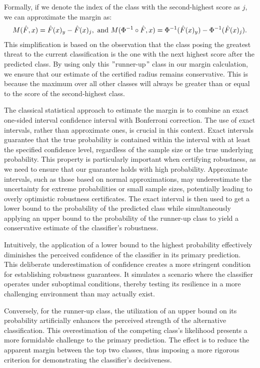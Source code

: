 Formally, if we denote the index of the class with the second-highest score as $j$, we can approximate the margin as:
\begin{align*}
    M(\Hat{F},x) =\Hat{F}(x)_{y} - \Hat{F}(x)_j, \text{ and }M(\Phi^{-1}\circ\Hat{F},x) =\Phi^{-1}(\Hat{F}(x)_{y}) - \Phi^{-1}(\Hat{F}(x)_j).
\end{align*}
This simplification is based on the observation that the class posing the greatest threat to the current classification is the one with the next highest score after the predicted class.
By using only this \("\)runner-up\("\) class in our margin calculation, we ensure that our estimate of the certified radius remains conservative.
This is because the maximum over all other classes will always be greater than or equal to the score of the second-highest class.

The classical statistical approach to estimate the margin is to combine an exact one-sided interval confidence interval with Bonferroni correction.
The use of exact intervals, rather than approximate ones, is crucial in this context.
Exact intervals guarantee that the true probability is contained within the interval with at least the specified confidence level, regardless of the sample size or the true underlying probability.
This property is particularly important when certifying robustness, as we need to ensure that our guarantee holds with high probability.
Approximate intervals, such as those based on normal approximations, may underestimate the uncertainty for extreme probabilities or small sample sizes, potentially leading to overly optimistic robustness certificates.
The exact interval is then used to get a lower bound to the probability of the predicted class while simultaneously applying an upper bound to the probability of the runner-up class to yield a conservative estimate of the classifier's robustness.

Intuitively, the application of a lower bound to the highest probability effectively diminishes the perceived confidence of the classifier in its primary prediction.
This deliberate underestimation of confidence creates a more stringent condition for establishing robustness guarantees.
It simulates a scenario where the classifier operates under suboptimal conditions, thereby testing its resilience in a more challenging environment than may actually exist.

Conversely, for the runner-up class, the utilization of an upper bound on its probability artificially enhances the perceived strength of the alternative classification.
This overestimation of the competing class's likelihood presents a more formidable challenge to the primary prediction.
The effect is to reduce the apparent margin between the top two classes, thus imposing a more rigorous criterion for demonstrating the classifier's decisiveness.

